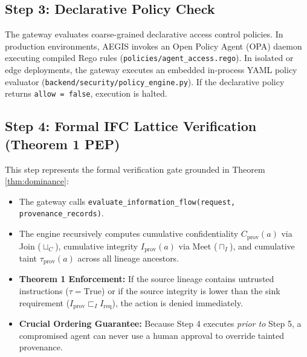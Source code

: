 \subsection{Step 3: Declarative Policy Check}
The gateway evaluates coarse-grained declarative access control policies. In production environments, AEGIS invokes an Open Policy Agent (OPA) daemon executing compiled Rego rules (\texttt{policies/agent\_access.rego}). In isolated or edge deployments, the gateway executes an embedded in-process YAML policy evaluator (\texttt{backend/security/policy\_engine.py}). If the declarative policy returns \texttt{allow = false}, execution is halted.

\subsection{Step 4: Formal IFC Lattice Verification (Theorem 1 PEP)}
This step represents the formal verification gate grounded in Theorem \ref{thm:dominance}:
\begin{itemize}
    \item The gateway calls \texttt{evaluate\_information\_flow(request, provenance\_records)}.
    \item The engine recursively computes cumulative confidentiality $C_{\text{prov}}(a)$ via Join ($\sqcup_C$), cumulative integrity $I_{\text{prov}}(a)$ via Meet ($\sqcap_I$), and cumulative taint $\tau_{\text{prov}}(a)$ across all lineage ancestors.
    \item \textbf{Theorem 1 Enforcement:} If the source lineage contains untrusted instructions ($\tau = \text{True}$) or if the source integrity is lower than the sink requirement ($I_{\text{prov}} \sqsubset_I I_{\text{req}}$), the action is denied immediately.
    \item \textbf{Crucial Ordering Guarantee:} Because Step 4 executes \textit{prior to} Step 5, a compromised agent can never use a human approval to override tainted provenance.
\end{itemize}

